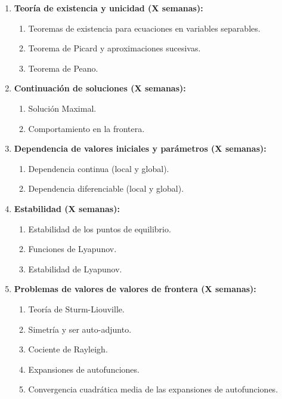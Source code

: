 \begin{refsection}
\begin{enumerate}
\item \textbf{Teoría de existencia y unicidad (X semanas):} 
\begin{enumerate}
    \item Teoremas de existencia para ecuaciones en variables separables. 
    \item Teorema de Picard y aproximaciones sucesivas.
    \item Teorema de Peano.
\end{enumerate}


\item \textbf{Continuación de soluciones (X semanas):} 
\begin{enumerate}
    \item Solución Maximal.
    \item Comportamiento en la frontera.
\end{enumerate}

\item \textbf{Dependencia de valores iniciales y parámetros (X semanas):} 
\begin{enumerate}
    \item Dependencia continua (local y global).
    \item Dependencia diferenciable (local y global).
\end{enumerate}

\item \textbf{Estabilidad (X semanas):} 
\begin{enumerate}
    \item Estabilidad de los puntos de equilibrio.
    \item Funciones de Lyapunov.
    \item Estabilidad de Lyapunov.
\end{enumerate}

\item \textbf{Problemas de valores de valores de frontera (X semanas):} 
\begin{enumerate}
    \item Teoría de Sturm-Liouville.
    \item Simetría y ser auto-adjunto.
    \item Cociente de Rayleigh.
    \item Expansiones de autofunciones.
    \item Convergencia cuadrática media de las expansiones de autofunciones.
\end{enumerate}


\end{enumerate}
\end{refsection}
